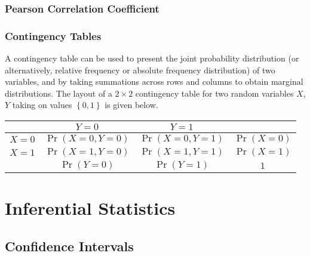 \documentclass[11pt]{report} %
\begin{document}
\subsubsection{Pearson Correlation Coefficient}

\subsubsection{Contingency Tables}

A contingency table can be used to present the joint probability distribution (or alternatively, relative frequency or absolute frequency distribution) of two variables, and by taking summations across rows and columns to obtain marginal distributions. The layout of a $2\times 2$ contingency table for two random variables $X$, $Y$ taking on values $\left\{0, 1\right\}$ is given below.
\begin{table}\centering
\begin{tabular}{|c||c|c|c|}
\hline 
 & $Y = 0$ & $Y = 1$ & \\
\hline 
\hline 
$X = 0$ & $\operatorname{Pr}\left(X = 0, Y = 0\right)$ &  $\operatorname{Pr}\left(X = 0, Y = 1\right)$ & $\operatorname{Pr}\left(X = 0\right)$ \\
\hline 
$X = 1$ & $\operatorname{Pr}\left(X = 1, Y = 0\right)$ & $\operatorname{Pr}\left(X = 1, Y = 1\right)$ & $\operatorname{Pr}\left(X = 1\right)$ \\
\hline 
 & $\operatorname{Pr}\left(Y = 0\right)$ & $\operatorname{Pr}\left(Y = 1\right)$ & $1$ \\
 \hline
\end{tabular}
\end{table}

\section{Inferential Statistics}

\subsection{Confidence Intervals}
\end{document}
